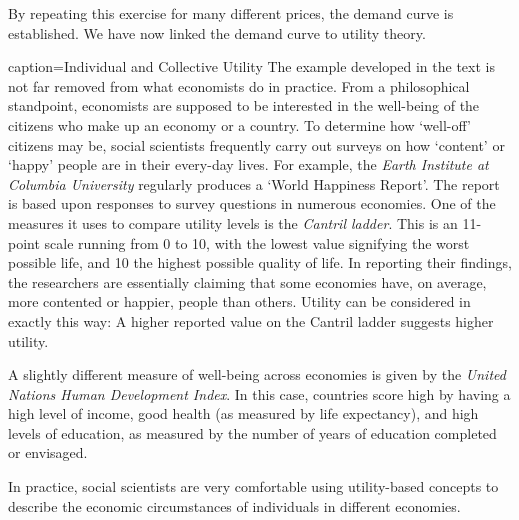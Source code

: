 By repeating this exercise for many different prices, the demand curve is
established. We have now linked the demand curve to utility theory.




\newhtmlpage

\begin{ApplicationBox}{caption={Individual and Collective Utility \label{app:indcolutilityapp}}}
The example developed in the text is not far removed from what economists do
in practice. From a philosophical standpoint, economists are supposed to be
interested in the well-being of the citizens who make up an economy or a
country. To determine how `well-off' citizens may be, social scientists
frequently carry out surveys on how `content' or `happy' people are in
their every-day lives. For example, the \textit{Earth Institute at Columbia
University} regularly produces a `World Happiness Report'. The report is
based upon responses to survey questions in numerous economies. One of the
measures it uses to compare utility levels is the \textit{Cantril ladder}. This is an
11-point scale running from 0 to 10, with the lowest value signifying the
worst possible life, and 10 the highest possible quality of life. In
reporting their findings, the researchers are essentially claiming that some
economies have, on average, more contented or happier, people than others.
Utility can be considered in exactly this way: A higher reported value on
the Cantril ladder suggests higher utility.

A slightly different measure of well-being across economies is given by the
\textit{United Nations Human Development Index}. In this case, countries score high
by having a high level of income, good health (as measured by life
expectancy), and high levels of education, as measured by the number of
years of education completed or envisaged.

In practice, social scientists are very comfortable using utility-based
concepts to describe the economic circumstances of individuals in different
economies.
\end{ApplicationBox}
